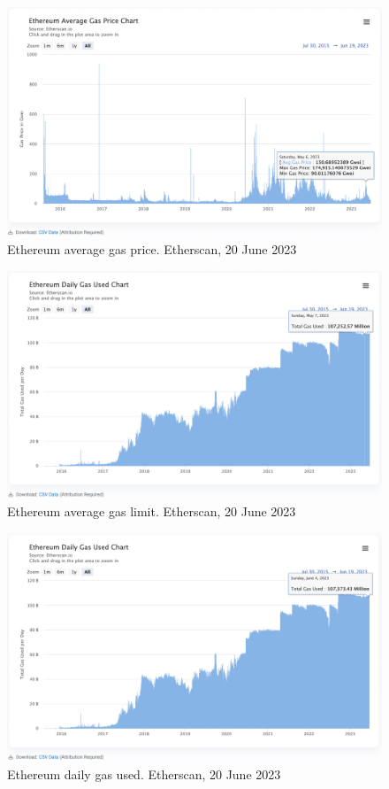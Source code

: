 \documentclass[UTF8]{article}
\begin{document}
{\begin{figure}[htbp]
\begin{center}
\includegraphics[width=0.9\linewidth]{images/ethavgas}
\caption{Ethereum average gas price. Etherscan, 20 June 2023}
\label{fig:ethavgas}
\end{center}
\end{figure}

\begin{figure}[htbp]
\begin{center}
\includegraphics[width=0.9\linewidth]{images/ethgaslim}
\caption{Ethereum average gas limit. Etherscan, 20 June 2023}
\label{fig:ethgaslim}
\end{center}
\end{figure}

\begin{figure}[htbp]
\begin{center}
\includegraphics[width=0.9\linewidth]{images/ethgasused}
\caption{Ethereum daily gas used. Etherscan, 20 June 2023}
\label{fig:ethgasused}
\end{center}
\end{figure}

}
\end{document}
